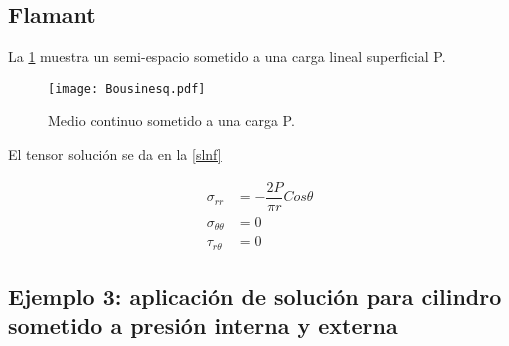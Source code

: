 \documentclass[../notas medios.tex]{subfiles}
\begin{document}
\subsection{Flamant}

La \cref{Flamant} muestra un semi-espacio sometido a una carga lineal superficial P. 

\begin{figure}[H]
\centering
	\texttt{[image: Bousinesq.pdf]}
	\caption{Medio continuo sometido a una carga P.}
	\label{Flamant}
\end{figure}

El tensor solución se da en la \cref{slnf}

\begin{equation}
\begin{split}
{ \sigma_{rr}} & = -\dfrac{2P}{\pi r} Cos \theta \\
{\sigma_{\theta\theta}}  &= 0\\
{\tau_{r\theta}}&= 0
\end{split}
\label{slnf}
\end{equation}

\subsection*{Ejemplo 3: aplicación de solución para cilindro sometido a presión interna y externa}
\end{document}
